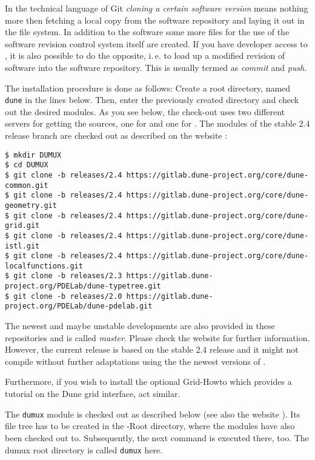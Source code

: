 In the technical language of Git \emph{cloning a certain software version} means nothing more then fetching
a local copy from the software repository and laying it out in the file system.
In addition to the software some more files for the use of the software revision
control system itself are created. If you have developer access to \Dumux, it is
also possible to do the opposite, i.\,e. to load up a modified revision of software
into the software repository. This is usually termed as \emph{commit} and \emph{push}.

The installation procedure is done as follows:
Create a  {\Dune} root directory, named \texttt{dune} in the lines below.
Then, enter the previously created directory and check out the desired modules.
As you see below, the check-out uses two different servers for getting the sources,
one for \Dune and one for \Dumux.
The \Dune modules of the stable 2.4 release branch are checked out as described
on the \Dune website \cite{DUNE-DOWNLOAD-GIT}:

\begin{lstlisting}[style=Bash]
$ mkdir DUMUX
$ cd DUMUX
$ git clone -b releases/2.4 https://gitlab.dune-project.org/core/dune-common.git
$ git clone -b releases/2.4 https://gitlab.dune-project.org/core/dune-geometry.git
$ git clone -b releases/2.4 https://gitlab.dune-project.org/core/dune-grid.git
$ git clone -b releases/2.4 https://gitlab.dune-project.org/core/dune-istl.git
$ git clone -b releases/2.4 https://gitlab.dune-project.org/core/dune-localfunctions.git
$ git clone -b releases/2.3 https://gitlab.dune-project.org/PDELab/dune-typetree.git
$ git clone -b releases/2.0 https://gitlab.dune-project.org/PDELab/dune-pdelab.git
\end{lstlisting}

The newest and maybe unstable developments are also provided in these repositories and is called \emph{master}.
Please check the \Dune website \cite{DUNE-DOWNLOAD-GIT} for further information. However, the current \Dumux release
is based on the stable 2.4 release and it might not compile without further adaptations using the the newest versions of \Dune.

Furthermore, if you wish to install the optional \Dune Grid-Howto which provides a tutorial
on the Dune grid interface, act similar.

The \texttt{dumux} module is checked out as described below (see also the \Dumux website \cite{DUMUX-HP}).
Its file tree has to be created in the \Dune-Root directory, where the \Dune modules
have also been checked out to. Subsequently, the next command
is executed there, too. The dumux root directory is called \texttt{dumux} here.

